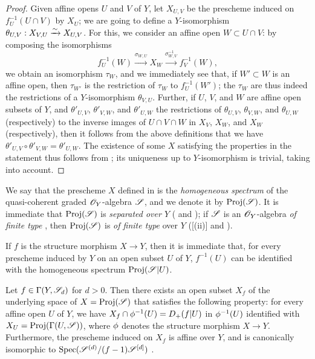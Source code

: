\begin{proof}
Given affine opens $U$ and $V$ of $Y$, let $X_{U,V}$ be the prescheme induced on $f_U^{-1}(U\cap V)$ by $X_U$;
we are going to define a $Y$-isomorphism $\theta_{U,V}:X_{V,U}\xrightarrow{\sim} X_{U,V}$.
For this, we consider an affine open $W\subset U\cap V$:
by composing the isomorphisms
\[
  f_U^{-1}(W)
  \xrightarrow{\sigma_{W,U}} X_W
  \xrightarrow{\sigma_{W,V}^{-1}} f_V^{-1}(W),
\]
we obtain an isomorphism $\tau_W$, and we immediately see that, if $W'\subset W$ is an affine open, then $\tau_{W'}$ is the restriction of $\tau_W$ to $f_U^{-1}(W')$;
the $\tau_W$ are thus indeed the restrictions of a $Y$-isomorphism $\theta_{V,U}$.
Further, if $U$, $V$, and $W$ are affine open subsets of $Y$, and $\theta'_{U,V}$, $\theta'_{V,W}$, and $\theta'_{U,W}$ the restrictions of $\theta_{U,V}$, $\theta_{V,W}$, and $\theta_{U,W}$ (respectively) to the inverse images of $U\cap V\cap W$ in $X_V$, $X_W$, and $X_W$ (respectively), then it follows from the above definitions that we have $\theta'_{U,V}\circ\theta'_{V,W}=\theta'_{U,W}$.
The existence of some $X$ satisfying the properties in the statement thus follows from ;
its uniqueness up to $Y$-isomorphism is trivial, taking  into account.
\end{proof}

\begin{env}[3.1.3]
\label{II.3.1.3}
We say that the prescheme $X$ defined in  is the \emph{homogeneous spectrum} of the quasi-coherent graded $\mathscr{O}_Y$-algebra $\mathscr{S}$, and we denote it by $\operatorname{Proj}(\mathscr{S})$.
It is immediate that $\operatorname{Proj}(\mathscr{S})$ is \emph{separated over $Y$} ( and );
if $\mathscr{S}$ is an $\mathscr{O}_Y$-algebra \emph{of finite type} , then $\operatorname{Proj}(\mathscr{S})$ is \emph{of finite type} over $Y$ ([(ii)] and ).

If $f$ is the structure morphism $X\to Y$, then it is immediate that, for every prescheme induced by $Y$ on an open subset $U$ of $Y$, $f^{-1}(U)$ can be identified with the homogeneous spectrum $\operatorname{Proj}(\mathscr{S}|U)$.
\end{env}

\begin{proposition}[3.1.4]
\label{II.3.1.4}
Let $f\in\Gamma(Y,\mathscr{S}_d)$ for $d>0$.
Then there exists an open subset $X_f$ of the underlying space of $X=\operatorname{Proj}(\mathscr{S})$ that satisfies the following property:
for every affine open $U$ of $Y$, we have $X_f\cap\phi^{-1}(U)=D_+(f|U)$ in $\phi^{-1}(U)$ identified with $X_U=\operatorname{Proj}(\Gamma(U,\mathscr{S}))$, where $\phi$ denotes the structure morphism $X\to Y$.
Furthermore, the prescheme induced on $X_f$ is affine over $Y$, and is canonically isomorphic to $\operatorname{Spec}(\mathscr{S}^{(d)}/(f-1)\mathscr{S}^{[d]})$ .
\end{proposition}

